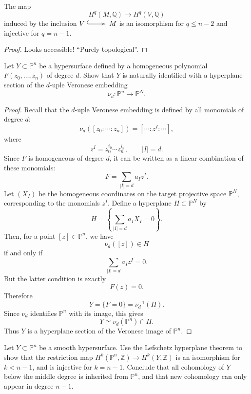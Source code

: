 \begin{theorem}
\label{theorem-lefschetz-hyperplane}
The map
$$
H^q(M,\mathbb{Q}) \to H^q(V,\mathbb{Q})
$$
induced by the inclusion $V
\xymatrix{\ar@{^{(}->}[r]&} M$
is an isomorphism for $q \leq  n-2$
and injective for $q=n-1$.
\end{theorem}

\begin{proof}
Looks accessible! ``Purely topological''.
\end{proof}

\begin{exercise}
\label{exercise-hypersurface-as-hyperplane-section}
Let \(Y\subset \mathbb P^n\) be a hypersurface
defined by a homogeneous polynomial
\(F(z_0,\dots,z_n)\) of degree \(d\). Show that
\(Y\) is naturally identified with a hyperplane
section of the \(d\)-uple Veronese embedding
\[
\nu_d:\mathbb P^n\longrightarrow \mathbb P^N.
\]
\end{exercise}

\begin{proof}
Recall that the \(d\)-uple Veronese embedding
is defined by all monomials of degree \(d\):
\[
\nu_d([z_0:\cdots:z_n])
=
[\cdots : z^I : \cdots],
\]
where
\[
z^I=z_0^{i_0}\cdots z_n^{i_n},
\qquad
|I|=d.
\]
Since \(F\) is homogeneous of degree \(d\), it
can be written as a linear combination of these
monomials:
\[
F=\sum_{|I|=d} a_I z^I.
\]
Let \((X_I)\) be the homogeneous coordinates on
the target projective space \(\mathbb P^N\),
corresponding to the monomials \(z^I\). Define
a hyperplane \(H\subset \mathbb P^N\) by
\[
H=\left\{\sum_{|I|=d} a_I X_I=0\right\}.
\]
Then, for a point \([z]\in\mathbb P^n\), we have
\[
\nu_d([z])\in H
\]
if and only if
\[
\sum_{|I|=d} a_I z^I=0.
\]
But the latter condition is exactly
\[
F(z)=0.
\]
Therefore
\[
Y
=
\{F=0\}
=
\nu_d^{-1}(H).
\]
Since \(\nu_d\) identifies \(\mathbb P^n\) with
its image, this gives
\[
Y
\simeq
\nu_d(\mathbb P^n)\cap H.
\]
Thus \(Y\) is a hyperplane section of the
Veronese image of \(\mathbb P^n\).
\end{proof}

\begin{exercise}
\label{exercise-lefschetz-hypersurface}
Let $Y\subset \mathbb P^n$ be a smooth
hypersurface. Use the Lefschetz hyperplane
theorem to show that the restriction map
$
H^k(\mathbb P^n,\mathbb Z)
\longrightarrow
H^k(Y,\mathbb Z)
$
is an isomorphism for $k<n-1$, and is
injective for $k=n-1$. Conclude that all
cohomology of $Y$ below the middle degree is
inherited from $\mathbb P^n$, and that new
cohomology can only appear in degree $n-1$.
\end{exercise}

